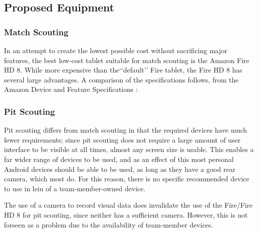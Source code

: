 \documentclass[11pt]{report}
\begin{document}

\subsection{Proposed Equipment}
\label{sec:propequip}

\subsubsection{Match Scouting}

In an attempt to create the lowest possible cost without sacrificing major features, the best low-cost tablet suitable for match scouting is the Amazon Fire HD 8. While more expensive than the\lq\lq{default}\rq\rq{} Fire tablet, the Fire HD 8 has several large advantages. A comparison of the specifications follows, from the Amazon Device and Feature Specifications \cite{amazondevicespec}:

\begin{center}


\end{center}

\subsubsection{Pit Scouting}

Pit scouting differs from match scouting in that the required devices have much fewer requirements; since pit scouting does not require a large amount of user interface to be visible at all times, almost any screen size is usable. This enables a far wider range of devices to be used, and as an effect of this most personal Android devices should be able to be used, as long as they have a good rear camera, which most do. For this reason, there is no specific recommended device to use in leiu of a team-member-owned device. \newline

The use of a camera to record visual data does invalidate the use of the Fire/Fire HD 8 for pit scouting, since neither has a sufficient camera. However, this is not forseen as a problem due to the availability of team-member devices.

 
\end{document}
